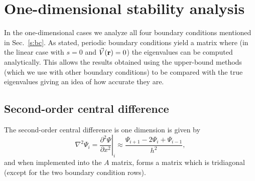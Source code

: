\documentclass{article}
\begin{document}
\section{One-dimensional stability analysis}
\label{s:1dstb}
In the one-dimensional cases we analyze all four boundary conditions mentioned in Sec.~\ref{s:bc}.  As stated, periodic boundary conditions yield a matrix where (in the linear case with $s=0$ and $\vec V({\bf r})=0$) the eigenvalues can be computed analytically.  This allows the results obtained using the upper-bound methods (which we use with other boundary conditions) to be compared with the true eigenvalues giving an idea of how accurate they are.

\subsection{Second-order central difference}
\label{s:1dcdstb}
The second-order central difference is one dimension is given by
\[
\nabla^2\Psi_i = \left. \frac{\partial^2 \Psi}{\partial x^2} \right|_i \approx \frac{\Psi_{i+1} -2\Psi_i +\Psi_{i-1}}{h^2},
\]
and when implemented into the $A$ matrix, forms a matrix which is tridiagonal (except for the two boundary condition rows).
\end{document}
